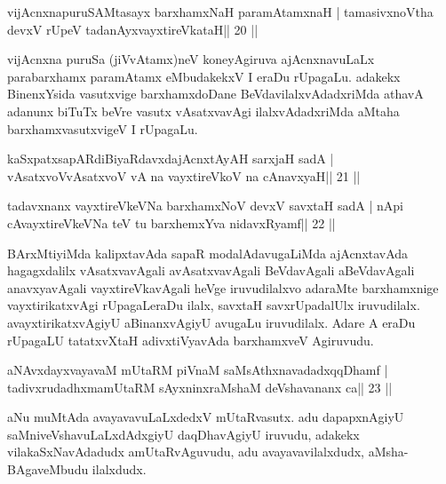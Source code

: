 \begin{shl}
vijAcnxnapuruSAMtasayx barxhamxNaH paramAtamxnaH |
tamasivxnoV\s tha devxV rUpeV tadanAyxvayxtireVkataH\hfill || 20 ||
\end{shl}

\begin{artha}
vijAcnxna puruSa (jiVvAtamx)neV koneyAgiruva ajAcnxnavuLaLx parabarxhamx paramAtamx eMbudakekxV I eraDu rUpagaLu. adakekx BinenxYsida vasutxvige barxhamxdoDane BeVdavilalxvAdadxriMda athavA adanunx biTuTx beVre vasutx vAsatxvavAgi ilalxvAdadxriMda aMtaha barxhamxvasutxvigeV I rUpagaLu.
\end{artha}



\begin{shl}
kaSxpatxsapARdiBiyaRdavxdajAcnxtAyAH sarxjaH sadA |
vAsatxvoV\s vAsatxvoV vA na vayxtireVkoV na cAnavxyaH\hfill || 21 ||
\end{shl}

\begin{shl}
tadavxnanx vayxtireVkeVNa barxhamxNoV devxV savxtaH sadA |
nApi cAvayxtireVkeVNa teV tu barxhemxYva nidavxRyamf\hfill || 22 ||
\end{shl}

\begin{artha}
BArxMtiyiMda kalipxtavAda sapaR modalAdavugaLiMda ajAcnxtavAda
hagagxdalilx vAsatxvavAgali avAsatxvavAgali BeVdavAgali aBeVdavAgali
anavxyavAgali vayxtireVkavAgali heVge iruvudilalxvo adaraMte
barxhamxnige vayxtirikatxvAgi rUpagaLeraDu ilalx, savxtaH savxrUpadalUlx
iruvudilalx. avayxtirikatxvAgiyU aBinanxvAgiyU avugaLu iruvudilalx.
Adare A eraDu rUpagaLU tatatxvXtaH adivxtiVyavAda barxhamxveV Agiruvudu.
\end{artha}



\begin{shl}
aNAvxdayxvayavaM mUtaRM piVnaM saMsAthxnavadadxqqDhamf |
tadivxrudadhxmamUtaRM sAyxninxraMshaM deVshavananx ca\hfill || 23 ||
\end{shl}

\begin{artha}
aNu muMtAda avayavavuLaLxdedxV mUtaRvasutx. adu dapapxnAgiyU saMniveVshavuLaLxdAdxgiyU daqDhavAgiyU iruvudu, adakekx vilakaSxNavAdadudx amUtaRvAguvudu, adu avayavavilalxdudx, aMsha-BAgaveMbudu ilalxdudx.
\end{artha}

